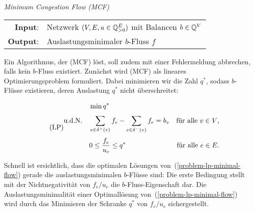 \begin{center}
	\begin{mdframed}
		\centering
		\emph{Minimum Congestion Flow (MCF)} \\[1em]
		\begin{tabular}{rl}
			{\bfseries Input}: &Netzwerk $(V, E,u \in \mathbb{Q}^E_{>0})$ mit Balancen $b\in\mathbb{Q}^V$\\
			{\bfseries Output}: &Auslastungsminimaler $b$-Fluss $f$
		\end{tabular}
	\end{mdframed}
\end{center}

Ein Algorithmus, der (MCF) löst, soll zudem mit einer Fehlermeldung abbrechen, falls kein $b$-Fluss existiert.
Zunächst wird (MCF) als lineares Optimierungsproblem formuliert.
Dabei minimieren wir die Zahl $q^*$, sodass $b$-Flüsse existieren, deren Auslastung $q^*$ nicht überschreitet:

\begin{equation}\tag{LP}\label{problem-lp-minimal-flow}
\begin{aligned}
& \min q^* \\[0.3em]
\text{u.d.N.\quad} & \sum_{e\in \delta^+(v)} f_e - \sum_{e\in\delta^-(v)} f_e = b_v & \text{für alle $v\in V$,} \\[0.3em]
& 0 \leq \frac{f_e}{u_e} \leq q^* & \text{für alle $e\in E$.}
\end{aligned}
\end{equation}

Schnell ist ersichtlich, dass die optimalen Lösungen von~(\ref{problem-lp-minimal-flow}) gerade die auslastungsminimalen $b$-Flüsse sind:
Die erste Bedingung stellt mit der Nichtnegativität von $f_e/u_e$ die $b$-Fluss-Eigenschaft dar.
Die Auslastungsminimalität einer Optimal\-lösung von~(\ref{problem-lp-minimal-flow}) wird durch das Minimieren der Schranke $q^*$ von $f_e / u_e$ sichergestellt.

